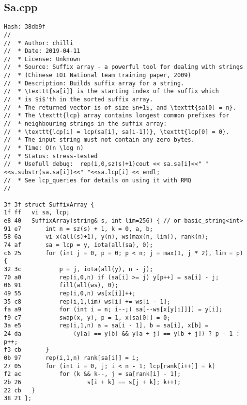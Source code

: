 \documentclass[11pt, a4paper, twoside]{article}
\begin{document}
\subsection{Sa.cpp}
\begin{lstlisting}
Hash: 38db9f
// 
//  * Author: chilli
//  * Date: 2019-04-11
//  * License: Unknown
//  * Source: Suffix array - a powerful tool for dealing with strings
//  * (Chinese IOI National team training paper, 2009)
//  * Description: Builds suffix array for a string.
//  * \texttt{sa[i]} is the starting index of the suffix which
//  * is $i$'th in the sorted suffix array.
//  * The returned vector is of size $n+1$, and \texttt{sa[0] = n}.
//  * The \texttt{lcp} array contains longest common prefixes for
//  * neighbouring strings in the suffix array:
//  * \texttt{lcp[i] = lcp(sa[i], sa[i-1])}, \texttt{lcp[0] = 0}.
//  * The input string must not contain any zero bytes.
//  * Time: O(n \log n)
//  * Status: stress-tested
//  * Usefull debug:  rep(i,0,sz(s)+1)cout << sa.sa[i]<<" "<<s.substr(sa.sa[i])<<" "<<sa.lcp[i] << endl;
//  * See lcp_queries for details on using it with RMQ
//  

3f 3f struct SuffixArray {
1f ff 	vi sa, lcp;
e8 40 	SuffixArray(string& s, int lim=256) { // or basic_string<int>
91 e7 		int n = sz(s) + 1, k = 0, a, b;
58 6a 		vi x(all(s)+1), y(n), ws(max(n, lim)), rank(n);
74 af 		sa = lcp = y, iota(all(sa), 0);
c6 25 		for (int j = 0, p = 0; p < n; j = max(1, j * 2), lim = p) {
32 3c 			p = j, iota(all(y), n - j);
70 a0 			rep(i,0,n) if (sa[i] >= j) y[p++] = sa[i] - j;
06 91 			fill(all(ws), 0);
49 55 			rep(i,0,n) ws[x[i]]++;
35 c8 			rep(i,1,lim) ws[i] += ws[i - 1];
fa a9 			for (int i = n; i--;) sa[--ws[x[y[i]]]] = y[i];
f9 c7 			swap(x, y), p = 1, x[sa[0]] = 0;
3a e5 			rep(i,1,n) a = sa[i - 1], b = sa[i], x[b] =
24 da 				(y[a] == y[b] && y[a + j] == y[b + j]) ? p - 1 : p++;
f3 cb 		}
0b 97 		rep(i,1,n) rank[sa[i]] = i;
27 05 		for (int i = 0, j; i < n - 1; lcp[rank[i++]] = k)
f2 ac 			for (k && k--, j = sa[rank[i] - 1];
2b 26 					s[i + k] == s[j + k]; k++);
22 cb 	}
38 21 };
\end{lstlisting}
\end{document}
